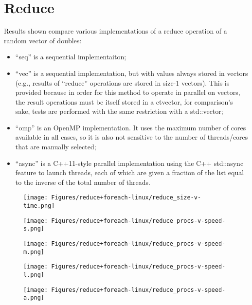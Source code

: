 \section{Reduce}
Results shown compare various implementations of a reduce operation of a random
vector of doubles:
\begin{itemize}
 \item ``seq'' is a sequential implementaiton;
 \item ``vec'' is a sequential implementation, but with values always stored in
 vectors (e.g., results of ``reduce'' operations are stored in size-1 vectors).
 This is provided because in order for this method to operate in parallel on
 vectors, the result operations must be itself stored in a ctvector, for
 comparison's sake, tests are performed with the same restriction with a
 std::vector;
 \item ``omp'' is an OpenMP implementation. It uses the maximum number of cores
 available in all cases, so it is also not sensitive to the number of
 threads/cores that are manually selected;
 \begin{comment} not using this right now
 \item ``avx'' uses a 256-bit AVX instruction to perform the addition of 4 doubles
 simultaneously until only 4 values remain, and then uses more avx instructions
 to sum the resulting values. Thus, the speedup of this implementation can be
 compared directly to other implementations when using 4 concurrent threads;
 \end{comment}
 \item ``async'' is a C++11-style parallel implementation using the C++ std::async
 feature to launch threads, each of which are given a fraction of the list equal
 to the inverse of the total number of threads.
\end{itemize}

\begin{figure}[!h]
\centering
    \texttt{[image: Figures/reduce+foreach-linux/reduce\_size-v-time.png]}
\end{figure}
\begin{figure}[!h]
\centering
    \texttt{[image: Figures/reduce+foreach-linux/reduce\_procs-v-speed-s.png]}
\end{figure}
\begin{figure}[!h]
\centering
    \texttt{[image: Figures/reduce+foreach-linux/reduce\_procs-v-speed-m.png]}
\end{figure}
\begin{figure}[!h]
\centering
    \texttt{[image: Figures/reduce+foreach-linux/reduce\_procs-v-speed-l.png]}
\end{figure}
\begin{figure}[!h]
\centering
    \texttt{[image: Figures/reduce+foreach-linux/reduce\_procs-v-speed-a.png]}
\end{figure}

